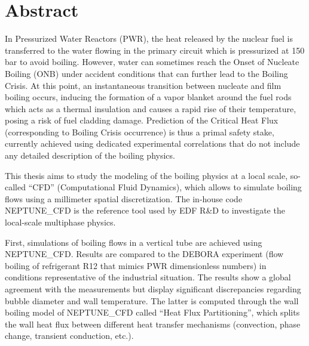 


\begingroup
\let\clearpage\relax
\let\cleardoublepage\relax
\let\cleardoublepage\relax

\chapter*{Abstract}

In Pressurized Water Reactors (PWR), the heat released by the nuclear fuel is transferred to the water flowing in the primary circuit which is pressurized at 150 bar to avoid boiling. However, water can sometimes reach the Onset of Nucleate Boiling (ONB) under accident conditions that can further lead to the Boiling Crisis. At this point, an instantaneous transition between nucleate and film boiling occurs, inducing the formation of a vapor blanket around the fuel rods which acts as a thermal insulation and  causes a rapid rise of their temperature, posing a risk of fuel cladding damage. Prediction of the Critical Heat Flux (corresponding to Boiling Crisis occurrence) is thus a primal safety stake, currently achieved using dedicated experimental correlations that do not include any detailed description of the boiling physics.

\npar

This thesis aims to study the modeling of the boiling physics at a local scale, so-called  “CFD” (Computational Fluid Dynamics), which allows to simulate boiling flows using a millimeter spatial discretization. The in-house code NEPTUNE\_CFD is the reference tool used by EDF R\&D to investigate the local-scale multiphase physics.

\npar

First, simulations of boiling flows in a vertical tube are achieved using NEPTUNE\_CFD. Results are compared to the DEBORA experiment (flow boiling of refrigerant R12 that mimics PWR dimensionless numbers) in conditions representative of the industrial situation. The results show a global agreement with the measurements but display significant discrepancies regarding bubble diameter and wall temperature. The latter is computed through the wall boiling model of NEPTUNE\_CFD called “Heat Flux Partitioning”, which splits the wall heat flux between different heat transfer mechanisms (convection, phase change, transient conduction, etc.).

